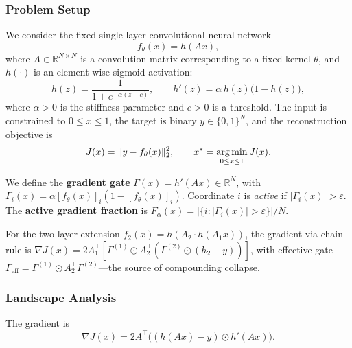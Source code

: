 \subsubsection{Problem Setup}

We consider the fixed single-layer convolutional neural network
\begin{equation}
  f_\theta(x) = h(Ax),
\end{equation}
where $A\in\mathbb{R}^{N\times N}$ is a convolution matrix corresponding to a
fixed kernel $\theta$, and $h(\cdot)$ is an element-wise sigmoid activation:
\begin{equation}
  h(z)=\frac{1}{1+e^{-\alpha(z-c)}},\qquad
  h'(z)=\alpha\,h(z)\bigl(1-h(z)\bigr),
\end{equation}
where $\alpha>0$ is the stiffness parameter and $c>0$ is a threshold. The
input is constrained to $0\leq x\leq 1$, the target is binary
$y\in\{0,1\}^{N}$, and the reconstruction objective is
\begin{equation}
  J(x)=\|y-f_\theta(x)\|_2^2,\qquad
  x^*=\operatorname*{arg\,min}_{0\leq x\leq 1}J(x).
  \label{eq:obj}
\end{equation}

We define the \textbf{gradient gate} $\Gamma(x)=h'(Ax)\in\mathbb{R}^N$, with
$\Gamma_i(x)=\alpha[f_\theta(x)]_i(1-[f_\theta(x)]_i)$. Coordinate $i$ is
\emph{active} if $|\Gamma_i(x)|>\varepsilon$. The \textbf{active gradient
fraction} is $F_\alpha(x)=|\{i:|\Gamma_i(x)|>\varepsilon\}|/N$.

For the two-layer extension $f_2(x)=h(A_2\cdot h(A_1 x))$, the gradient via
chain rule is
$\nabla J(x)=2A_1^\top[\Gamma^{(1)}\odot A_2^\top(\Gamma^{(2)}\odot(h_2-y))]$,
with effective gate
$\Gamma_{\mathrm{eff}}=\Gamma^{(1)}\odot A_2^\top\Gamma^{(2)}$---the source
of compounding collapse.

\subsubsection{Landscape Analysis}

The gradient is
\begin{equation}
  \nabla J(x)=2A^\top\bigl((h(Ax)-y)\odot h'(Ax)\bigr).
\end{equation}

